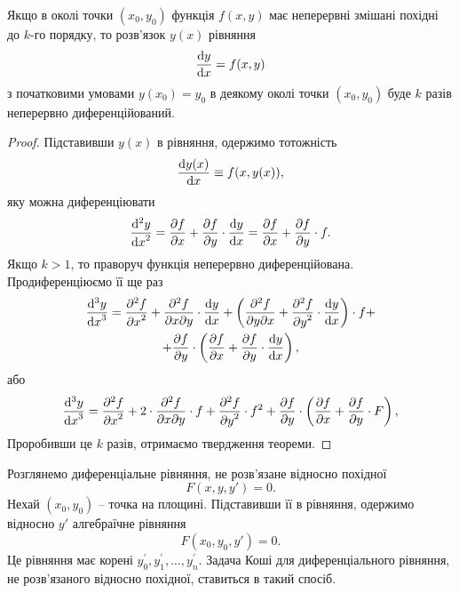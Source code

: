 \begin{theorem}
	Якщо в околі точки $(x_0,y_0)$ функція $f(x,y)$ має неперервні змішані похідні до $k$-го порядку, то розв’язок $y(x)$ рівняння
	\begin{equation*}
		\frac{\mathop{}\!\mathrm{d} y}{\mathop{}\!\mathrm{d} x} = f(x, y)
	\end{equation*}
	з початковими умовами $y(x_0)=y_0$ в деякому околі точки $(x_0,y_0)$ буде $k$ разів неперервно диференційований.
\end{theorem}
\begin{proof} 
	Підставивши $y(x)$ в рівняння, одержимо тотожність
	\begin{equation*}
		\frac{\mathop{}\!\mathrm{d} y(x)}{\mathop{}\!\mathrm{d} x} \equiv f(x, y(x)),
	\end{equation*}
	яку можна диференціювати
	\begin{equation*}
		\frac{\mathop{}\!\mathrm{d}^2 y}{{\mathop{}\!\mathrm{d} x}^2} = \frac{\partial f}{\partial x} + \frac{\partial f}{\partial y} \cdot \frac{\mathop{}\!\mathrm{d} y}{\mathop{}\!\mathrm{d} x} = \frac{\partial f}{\partial x} + \frac{\partial f}{\partial y} \cdot f.
	\end{equation*}
	Якщо $k > 1$, то праворуч функція неперервно диференційована. Продиференціюємо її ще раз
	\begin{multline*}
		\frac{\diff^3 y}{{\diff x}^3} = \frac{\partial^2 f}{{\partial x}^2} + \frac{\partial^2 f}{\partial x \partial y} \cdot \frac{\diff y}{\diff x} + \left( \frac{\partial^2 f}{\partial y \partial x} + \frac{\partial^2 f}{{\partial y}^2} \cdot \frac{\diff y}{\diff x} \right) \cdot f + \\
		+ \frac{\partial f}{\partial y} \cdot \left( \frac{\partial f}{\partial x} + \frac{\partial f}{\partial y} \cdot \frac{\diff y}{\diff x} \right),
	\end{multline*}
	або
	\begin{equation*}
		\frac{\mathop{}\!\mathrm{d}^3 y}{{\mathop{}\!\mathrm{d} x}^3} = \frac{\partial^2 f}{{\partial x}^2} + 2 \cdot \frac{\partial^2 f}{\partial x \partial y} \cdot f + \frac{\partial^2 f}{{\partial y}^2} \cdot f^2 + \frac{\partial f}{\partial y} \cdot \left( \frac{\partial f}{\partial x} + \frac{\partial f}{\partial y} \cdot F \right),
	\end{equation*}
	Проробивши це $k$ разів, отримаємо твердження теореми.
\end{proof}

Розглянемо диференціальне рівняння, не розв’язане відносно похідної
\begin{equation*}
	F(x, y, y') = 0.
\end{equation*}
Нехай $(x_0, y_0)$ -- точка на площині. Підставивши її в рівняння, одержимо відносно $y'$ алгебраїчне рівняння
\begin{equation*}
	F(x_0, y_0, y') = 0.
\end{equation*}
Це рівняння має корені $y_0^\prime, y_1^\prime, \ldots, y_n^\prime$. Задача Коші для диференціального рівняння, не розв’язаного відносно похідної, ставиться в такий спосіб. \\

